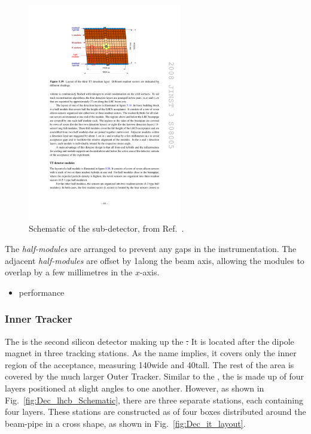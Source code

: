 \begin{figure}[!h]
    \centering
    \includegraphics[width=0.6\textwidth]{figs/Detector/tt_layout.pdf}
    \caption{Schematic of the \ttracker sub-detector, from Ref.~\cite{Alves:2008zz}.}
    \label{fig:Dec_tt_layout}   
\end{figure}

The \emph{half-modules} are arranged to prevent any gaps in the instrumentation. The adjacent \emph{half-modules} are offset by 1\cm along the beam axis, allowing the modules to overlap by a few millimetres in the $x$-axis. 


{\color{Red}
\begin{itemize}
\item performance
\end{itemize}
}


\subsubsection{Inner Tracker}

The \intr is the second silicon detector making up the \st. It is located after the dipole magnet in three tracking stations. As the name implies, it covers only the inner region of the acceptance, measuring 140\cm wide and 40\cm tall. The rest of the area is covered by the much larger Outer Tracker. Similar to the \ttracker, the \intr is made up of four layers positioned at slight angles to one another. However, as shown in Fig.~\ref{fig:Dec_lhcb_Schematic}, there are three separate \intr stations, each containing four layers.
These stations are constructed as of four boxes distributed around the beam-pipe in a cross shape, as shown in Fig.~\ref{fig:Dec_it_layout}. 

